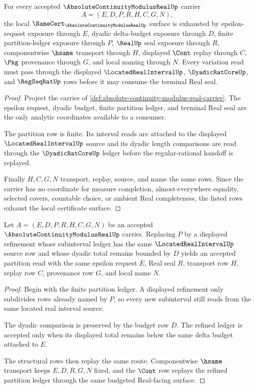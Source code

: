 \begin{theorem}
\label{thm:absolute-continuity-modulus-real-namecert-obligations}
For every accepted $\AbsoluteContinuityModulusRealUp$ carrier
$$
A=(E,D,P,R,H,C,G,N),
$$
the local $\NameCert_{\AbsoluteContinuityModulusRealUp}$ surface is exhausted by epsilon-request exposure through $E$, dyadic delta-budget exposure through $D$, finite partition-ledger exposure through $P$, $\RealUp$ seal exposure through $R$, componentwise $\hsame$ transport through $H$, displayed $\Cont$ replay through $C$, $\Pkg$ provenance through $G$, and local naming through $N$. Every variation read must pass through the displayed $\LocatedRealIntervalUp$, $\DyadicRatCoreUp$, and $\RegSeqRatUp$ rows before it may consume the terminal Real seal.
\end{theorem}
\begin{proof}
Project the carrier of \autoref{def:absolute-continuity-modulus-real-carrier}. The epsilon request, dyadic budget, finite partition ledger, and terminal Real seal are the only analytic coordinates available to a consumer.

The partition row is finite. Its interval reads are attached to the displayed $\LocatedRealIntervalUp$ source and its dyadic length comparisons are read through the $\DyadicRatCoreUp$ ledger before the regular-rational handoff is replayed.

Finally $H,C,G,N$ transport, replay, source, and name the same rows. Since the carrier has no coordinate for measure completion, almost-everywhere equality, selected covers, countable choice, or ambient Real completeness, the listed rows exhaust the local certificate surface.
\end{proof}

\begin{theorem}
\label{thm:absolute-continuity-modulus-real-partition-stability}
Let $A=(E,D,P,R,H,C,G,N)$ be an accepted $\AbsoluteContinuityModulusRealUp$ carrier. Replacing $P$ by a displayed refinement whose subinterval ledger has the same $\LocatedRealIntervalUp$ source row and whose dyadic total remains bounded by $D$ yields an accepted partition read with the same epsilon request $E$, Real seal $R$, transport row $H$, replay row $C$, provenance row $G$, and local name $N$.
\end{theorem}
\begin{proof}
Begin with the finite partition ledger. A displayed refinement only subdivides rows already named by $P$, so every new subinterval still reads from the same located real interval source.

The dyadic comparison is preserved by the budget row $D$. The refined ledger is accepted only when its displayed total remains below the same delta budget attached to $E$.

The structural rows then replay the same route. Componentwise $\hsame$ transport keeps $E,D,R,G,N$ fixed, and the $\Cont$ row replays the refined partition ledger through the same budgeted Real-facing surface.
\end{proof}

